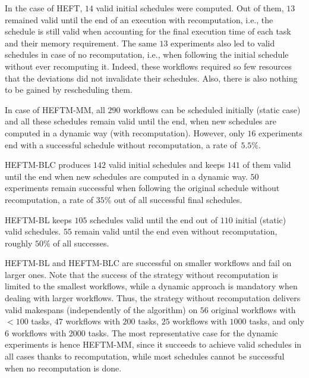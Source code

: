 \documentclass[conference]{IEEEtran}
\newcommand{\algo}[1]{\textsc{#1}}
\newcommand{\heft}{\algo{HEFT}\xspace}
\newcommand{\heftmm}{\algo{HEFTM-MM}\xspace}
\newcommand{\heftbl}{\algo{HEFTM-BL}\xspace}
\newcommand{\heftblc}{\algo{HEFTM-BLC}\xspace}
\newcommand{\new}[1]{{#1}}
\begin{document}
In the case of \heft, $14$ valid initial schedules were computed.
Out of them, $13$ remained valid \new{until the end of an execution with recomputation},
\new{i.e., the schedule is still valid when accounting for the final execution time of each task and their memory requirement.}
The same $13$ experiments also led to \new{valid schedules in case of no recomputation, i.e., when following the initial schedule without ever recomputing it}. 
Indeed, these workflows required so few resources that
\new{the deviations did not invalidate their schedules. Also, there is also nothing to be gained by rescheduling them.}

In case of \heftmm, all $290$ workflows can be scheduled initially \new{(static case)} and all these schedules remain valid until the end,
\new{when new schedules are computed in a dynamic way (with recomputation). However, only}
$16$ experiments end with a successful schedule without recomputation, a rate of~$5.5\%$.

\heftblc produces $142$ valid initial schedules and keeps $141$ of them valid until the end \new{when new schedules are computed in a dynamic way.}
$50$ experiments \new{remain} successful \new{when following the original schedule} without recomputation, a rate of $35\%$ out of all successful final schedules.

\heftbl keeps $105$ schedules valid until the end out of $110$ initial \new{(static)} valid schedules.
$55$ remain valid until the end even without recomputation, roughly $50\%$ of all successes.

\heftbl and \heftblc are successful on smaller workflows and fail on larger ones. 
\new{Note that the success of the strategy without recomputation is limited to  the smallest  workflows,
while a dynamic approach is mandatory when dealing with larger workflows.}
Thus, the strategy without recomputation delivers valid makespans (independently of the algorithm) 
on $56$ original workflows with $<100$ tasks, \new{$47$ workflows with  $200$ tasks, 
$25$ workflows with $1000$ tasks, and only $6$ workflows with $2000$ tasks.
The most representative case for the dynamic experiments is hence \heftmm, since it succeeds
to achieve valid schedules in all cases thanks to recomputation, while most schedules
cannot be successful when no recomputation is done. 
}
\end{document}
